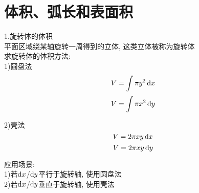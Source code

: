 \chapter{体积、弧长和表面积}
1.旋转体的体积\\
平面区域绕某轴旋转一周得到的立体, 这类立体被称为旋转体\\

求旋转体的体积方法:\\
1)圆盘法\\
\[V=\int\pi y^2\dif x\]
\[V=\int\pi x^2\dif y\]

2)壳法\\
\[V=2\pi xy\dif x\]
\[V=2\pi xy\dif y\]

应用场景:\\
1)若$\dif x$/$\dif y$平行于旋转轴, 使用圆盘法\\
2)若$\dif x$/$\dif y$垂直于旋转轴, 使用壳法\\
